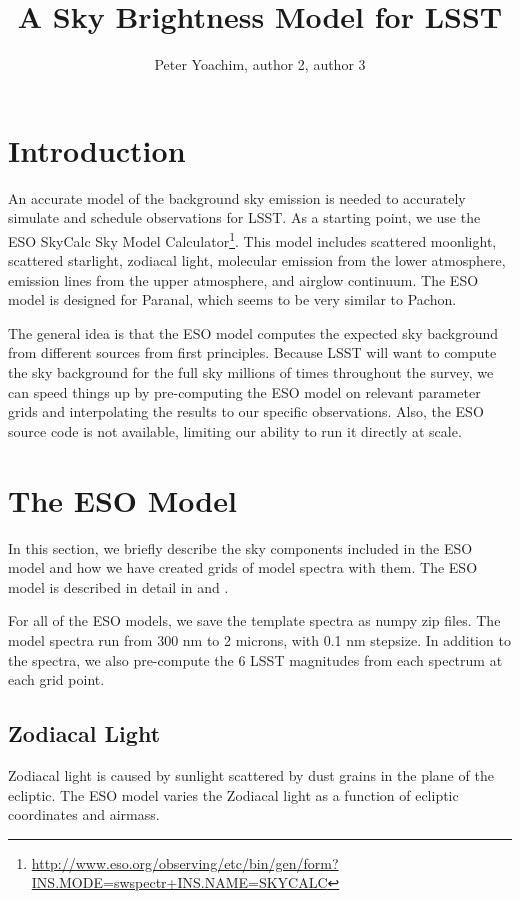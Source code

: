 \documentclass{emulateapj}  %
\begin{document}
\title{A Sky Brightness Model for LSST}


\author{Peter Yoachim, author 2, author 3}




\section{Introduction}

An accurate model of the background sky emission is needed to accurately simulate and schedule observations for LSST.  As a starting point, we use the ESO SkyCalc Sky Model Calculator\footnote{\url{http://www.eso.org/observing/etc/bin/gen/form?} \url{INS.MODE=swspectr+INS.NAME=SKYCALC}}.  This model includes scattered moonlight, scattered starlight, zodiacal light, molecular emission from the lower atmosphere, emission lines from the upper atmosphere, and airglow continuum.  The ESO model is designed for Paranal, which seems to be very similar to Pachon.  

The general idea is that the ESO model computes the expected sky background from different sources from first principles. Because LSST will want to compute the sky background for the full sky millions of times throughout the survey, we can speed things up by pre-computing the ESO model on relevant parameter grids and interpolating the results to our specific observations. Also, the ESO source code is not available, limiting our ability to run it directly at scale.

\section{The ESO Model}
In this section, we briefly describe the sky components included in the ESO model and how we have created grids of model spectra with them. The ESO model is described in detail in \citet{Noll12} and \citet{Jones13}.

For all of the ESO models, we save the template spectra as numpy zip files.  The model spectra run from 300 nm to 2 microns, with 0.1 nm stepsize.  In addition to the spectra, we also pre-compute the 6 LSST magnitudes from each spectrum at each grid point.

\subsection{Zodiacal Light}
Zodiacal light is caused by sunlight scattered by dust grains in the plane of the ecliptic.  The ESO model varies the Zodiacal light as a function of ecliptic coordinates and airmass.  
\end{document}
